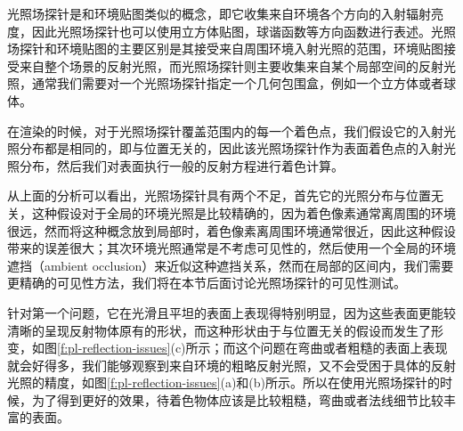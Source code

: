 光照场探针是和环境贴图类似的概念，即它收集来自环境各个方向的入射辐射亮度，因此光照场探针也可以使用立方体贴图，球谐函数等方向函数进行表述。光照场探针和环境贴图的主要区别是其接受来自周围环境入射光照的范围，环境贴图接受来自整个场景的反射光照，而光照场探针则主要收集来自某个局部空间的反射光照，通常我们需要对一个光照场探针指定一个几何包围盒，例如一个立方体或者球体。

在渲染的时候，对于光照场探针覆盖范围内的每一个着色点，我们假设它的入射光照分布都是相同的，即与位置无关的，因此该光照场探针作为表面着色点的入射光照分布，然后我们对表面执行一般的反射方程进行着色计算。

从上面的分析可以看出，光照场探针具有两个不足，首先它的光照分布与位置无关，这种假设对于全局的环境光照是比较精确的，因为着色像素通常离周围的环境很远，然而将这种概念放到局部时，着色像素离周围环境通常很近，因此这种假设带来的误差很大；其次环境光照通常是不考虑可见性的，然后使用一个全局的环境遮挡（ambient occlusion）来近似这种遮挡关系，然而在局部的区间内，我们需要更精确的可见性方法，我们将在本节后面讨论光照场探针的可见性测试。

针对第一个问题，它在光滑且平坦的表面上表现得特别明显，因为这些表面更能较清晰的呈现反射物体原有的形状，而这种形状由于与位置无关的假设而发生了形变，如图\ref{f:pl-reflection-issues}(c)所示；而这个问题在弯曲或者粗糙的表面上表现就会好得多，我们能够观察到来自环境的粗略反射光照，又不会受困于具体的反射光照的精度，如图\ref{f:pl-reflection-issues}(a)和(b)所示。所以在使用光照场探针的时候，为了得到更好的效果，待着色物体应该是比较粗糙，弯曲或者法线细节比较丰富的表面。

